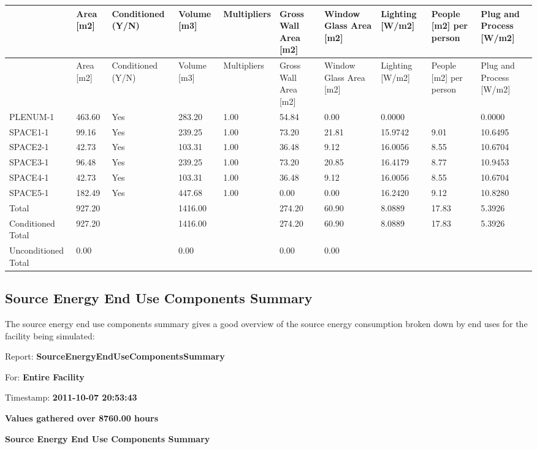 {\scriptsize
\begin{longtable}[c]{p{0.6in}p{0.6in}p{0.6in}p{0.6in}p{0.6in}p{0.6in}p{0.6in}p{0.6in}p{0.6in}p{0.6in}}
\toprule 
~ & Area [m2] & Conditioned (Y/N) & Volume [m3] & Multipliers & Gross Wall Area [m2] & Window Glass Area [m2] & Lighting [W/m2] & People [m2] per person & Plug and Process [W/m2] \tabularnewline
\midrule
\endfirsthead

\toprule 
~ & Area [m2] & Conditioned (Y/N) & Volume [m3] & Multipliers & Gross Wall Area [m2] & Window Glass Area [m2] & Lighting [W/m2] & People [m2] per person & Plug and Process [W/m2] \tabularnewline
\midrule
\endhead

PLENUM-1 & 463.60 & Yes & 283.20 & 1.00 & 54.84 & 0.00 & 0.0000 & ~ & 0.0000 \tabularnewline
SPACE1-1 & 99.16 & Yes & 239.25 & 1.00 & 73.20 & 21.81 & 15.9742 & 9.01 & 10.6495 \tabularnewline
SPACE2-1 & 42.73 & Yes & 103.31 & 1.00 & 36.48 & 9.12 & 16.0056 & 8.55 & 10.6704 \tabularnewline
SPACE3-1 & 96.48 & Yes & 239.25 & 1.00 & 73.20 & 20.85 & 16.4179 & 8.77 & 10.9453 \tabularnewline
SPACE4-1 & 42.73 & Yes & 103.31 & 1.00 & 36.48 & 9.12 & 16.0056 & 8.55 & 10.6704 \tabularnewline
SPACE5-1 & 182.49 & Yes & 447.68 & 1.00 & 0.00 & 0.00 & 16.2420 & 9.12 & 10.8280 \tabularnewline
Total & 927.20 & ~ & 1416.00 & ~ & 274.20 & 60.90 & 8.0889 & 17.83 & 5.3926 \tabularnewline
Conditioned Total & 927.20 & ~ & 1416.00 & ~ & 274.20 & 60.90 & 8.0889 & 17.83 & 5.3926 \tabularnewline
Unconditioned Total & 0.00 & ~ & 0.00 & ~ & 0.00 & 0.00 & ~ & ~ & ~ \tabularnewline
\bottomrule
\end{longtable}}

\subsection{Source Energy End Use Components Summary}\label{source-energy-end-use-components-summary}

The source energy end use components summary gives a good overview of the source energy consumption broken down by end uses for the facility being simulated:

Report: \textbf{SourceEnergyEndUseComponentsSummary}

For: \textbf{Entire Facility}

Timestamp: \textbf{2011-10-07 20:53:43}

\textbf{Values gathered over 8760.00 hours}

\textbf{Source Energy End Use Components Summary}

